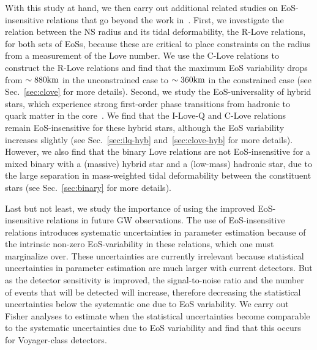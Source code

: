 \documentclass[prd,twocolumn,nofootinbib,superscriptaddress,amsmath,amssymb]{revtex4-1}
\begin{document}
With this study at hand, we then carry out additional related studies on EoS-insensitive relations that go beyond the work in~\cite{Yagi:binLove,Yagi:ILQ}. First, we investigate the relation between the NS radius and its tidal deformability, the R-Love relations, for both sets of EoSs, because these are critical to place constraints on the radius from a measurement of the Love number.  We use the C-Love relations to construct the R-Love relations and find that the maximum EoS variability drops from $\sim 880 {\rm{km}}$ in the unconstrained case to $\sim 360 {\rm{km}}$ in the constrained case (see Sec.~\ref{sec:clove} for more details). Second, we study the EoS-universality of hybrid stars, which experience strong first-order phase transitions from hadronic to quark matter in the core~\cite{Paschalidis2018,Most:2018eaw,Burgio:2018yix,Montana:2018bkb}. We find that the I-Love-Q and C-Love relations remain EoS-insensitive for these hybrid stars, although the EoS variability increases slightly (see Sec.~\ref{sec:ilq-hyb} and~\ref{sec:clove-hyb} for more details). However, we also find that the binary Love relations are not EoS-insensitive for a mixed binary with a (massive) hybrid star and a (low-mass) hadronic star, due to the large separation in mass-weighted tidal deformability between the constituent stars (see Sec.~\ref{sec:binary} for more details).

Last but not least, we study the importance of using the improved EoS-insensitive relations in future GW observations. The use of EoS-insensitive relations introduces systematic uncertainties in parameter estimation because of the intrinsic non-zero EoS-variability in these relations, which one must marginalize over. These uncertainties are currently irrelevant because statistical uncertainties in parameter estimation are much larger with current detectors. But as the detector sensitivity is improved, the signal-to-noise ratio and the number of events that will be detected will increase, therefore decreasing the statistical uncertainties below the systematic one due to EoS variability. We carry out Fisher analyses to estimate when the statistical uncertainties become comparable to the systematic uncertainties due to EoS variability and find that this occurs for Voyager-class detectors. 
\end{document}

